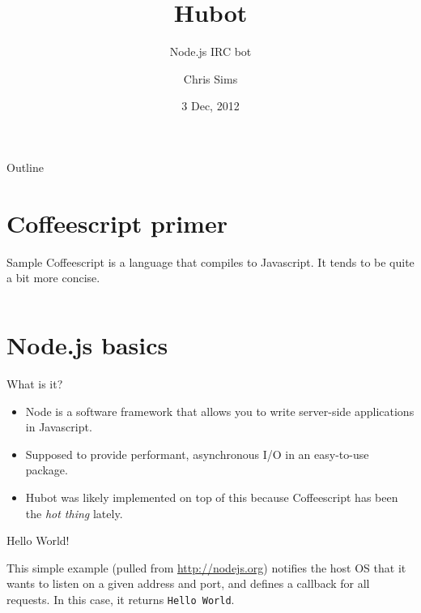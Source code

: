 \documentclass{beamer}
\title{Hubot}
\subtitle{Node.js IRC bot}
\author{Chris Sims}
\date{3 Dec, 2012}
\begin{document}
\frame{\titlepage}

\begin{frame}{Outline}
  \tableofcontents
\end{frame}


\section{Coffeescript primer}

\begin{frame}{Sample}
  Coffeescript is a language that compiles to Javascript.  It tends to be
  quite a bit more concise.

  \begin{columns}[c]
      { \tiny
      
      }
      { \tiny
      
      }
    \end{columns}

\end{frame}

\section{Node.js basics}

\begin{frame}{What is it?}
  \begin{itemize}
     \item Node is a software framework that allows you to write server-side applications
  in Javascript.

  \item Supposed to provide performant, asynchronous I/O in an easy-to-use package.

  \item Hubot was likely implemented on top of this because Coffeescript has been
  the \emph{hot thing} lately.

  \end{itemize}

  \end{frame}

  \begin{frame}{Hello World!}

  This simple example (pulled from \url{http://nodejs.org}) notifies the host OS
  that it wants to listen on a given address and port, and defines a callback for
  all requests.  In this case, it returns \texttt{Hello World}.

  \vspace{0.1\textheight}

  { \tiny
    \centering
  
  }


\end{frame}
\end{document}
